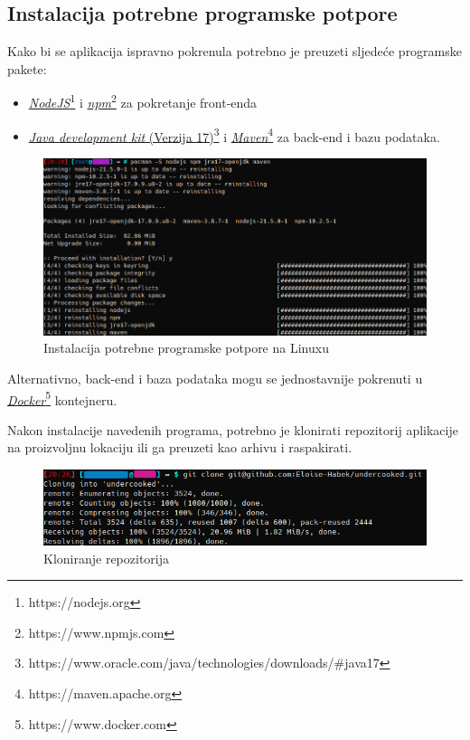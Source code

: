 			\subsection{Instalacija potrebne programske potpore}
			Kako bi se aplikacija ispravno pokrenula potrebno je preuzeti sljedeće programske pakete:
			\begin{itemize}
				\item \href{https://nodejs.org}{\textit{NodeJS}\footnote{https://nodejs.org}} i \href{https://www.npmjs.com}{\textit{npm}\footnote{https://www.npmjs.com}} za pokretanje front-enda
				\item \href{https://www.oracle.com/java/technologies/downloads/\#java17}{\textit{Java development kit} (Verzija 17)\footnote{https://www.oracle.com/java/technologies/downloads/\#java17}} i \href{https://maven.apache.org}{\textit{Maven}\footnote{https://maven.apache.org}} za back-end i bazu podataka.
			\end{itemize}
			\begin{figure}[H]
				\includegraphics[scale=0.7]{slike/instalacija_1.png} %
				\centering
				\caption{Instalacija potrebne programske potpore na Linuxu}
				\label{fig:Instalacija potrebne programske potpore na Linuxu}
			\end{figure}
			Alternativno, back-end i baza podataka mogu se jednostavnije pokrenuti u \href{https://www.docker.com}{\textit{Docker}\footnote{https://www.docker.com}} kontejneru.
			
			Nakon instalacije navedenih programa, potrebno je klonirati repozitorij aplikacije na proizvoljnu lokaciju ili ga preuzeti kao arhivu i raspakirati.
			\begin{figure}[H]
				\includegraphics[scale=0.8]{slike/instalacija_2.png} %
				\centering
				\caption{Kloniranje repozitorija}
				\label{fig:Kloniranje repozitorija}
			\end{figure}
